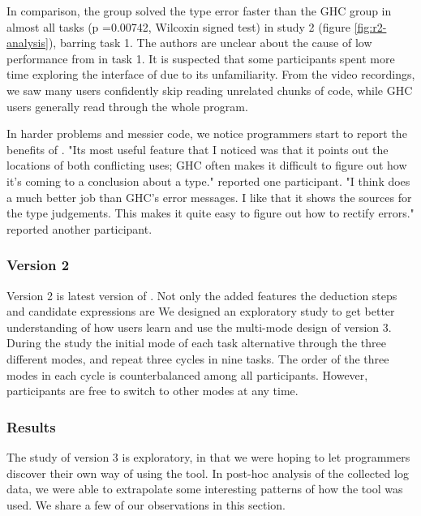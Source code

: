 In comparison, the \chameleon{} group solved the type error faster than the GHC group in almost all tasks (p =0.00742, Wilcoxin signed test) in study 2 (figure \ref{fig:r2-analysis}), barring task 1. The authors are unclear about the cause of low performance from \chameleon{} in task 1. It is suspected that some participants spent more time exploring the interface of \chameleon{} due to its unfamiliarity. From the video recordings, we saw many \chameleon{} users confidently skip reading unrelated chunks of code, while GHC users generally read through the whole program.


In harder problems and messier code, we notice programmers start to report the benefits of \chameleon{}. "Its most useful feature that I noticed was that it points out the locations of both conflicting uses; GHC often makes it difficult to figure out how it's coming to a conclusion about a type." reported one participant. "I think \chameleon{}  does a much better job than GHC's error messages. I like that it shows the sources for the type judgements. This makes it quite easy to figure out how to rectify errors." reported another participant.



\subsubsection{\textbf{Version 2}}  \label{sub:us4}

Version 2 is latest version of \chameleon{}. Not only the added features the deduction steps and candidate expressions are We designed an exploratory study to get better understanding of how users learn and use the multi-mode design of \chameleon{} version 3. During the study the initial mode of each task alternative through the three different modes, and repeat three cycles in nine tasks. The order of the three modes in each cycle is counterbalanced among all participants. However, participants are free to switch to other modes at any time. 



\subsubsection*{\textbf{Results}} 

The study of version 3 \chameleon{} is exploratory, in that we were hoping to let programmers discover their own way of using the tool. In post-hoc analysis of the collected log data, we were able to extrapolate some interesting patterns of how the tool was used. We share a few of our observations in this section.


